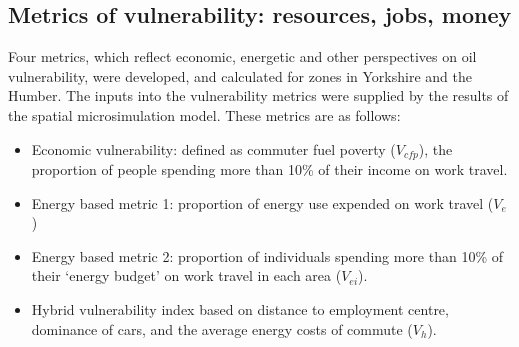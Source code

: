

\subsection{Metrics of vulnerability: resources, jobs, money}
\label{metrics}
Four metrics, which reflect economic, energetic and other
perspectives on oil vulnerability, were developed, and calculated
for zones in Yorkshire and the Humber. The inputs into the vulnerability
metrics were supplied by the results of the spatial microsimulation model.
These metrics are as follows:
\begin{itemize}
 \item Economic vulnerability: defined as commuter fuel poverty ($V_{cfp}$),
the proportion of people spending more
than 10\% of their income on work travel.
\item Energy based metric 1: proportion of energy use expended on
work travel ($V_e$)
\item Energy based metric 2: proportion of individuals
spending more than 10\% of their `energy
budget' on work travel in each area ($V_{ei}$).
\item Hybrid vulnerability index based on distance to employment centre,
dominance of cars, and the average energy costs of commute ($V_h$).
\end{itemize}

